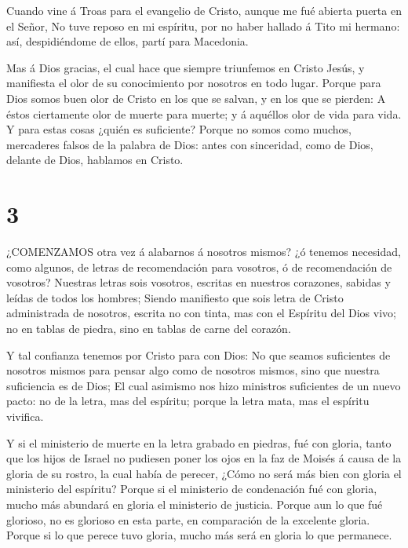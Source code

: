  Cuando vine á Troas para el evangelio de Cristo, aunque me
fué abierta puerta en el Señor,  No tuve reposo en mi
espíritu, por no haber hallado á Tito mi hermano: así, despidiéndome de
ellos, partí para Macedonia.

 Mas á Dios gracias, el cual hace que siempre triunfemos en
Cristo Jesús, y manifiesta el olor de su conocimiento por nosotros en
todo lugar.  Porque para Dios somos buen olor de Cristo en
los que se salvan, y en los que se pierden:  A éstos
ciertamente olor de muerte para muerte; y á aquéllos olor de vida para
vida. Y para estas cosas ¿quién es suficiente?  Porque no
somos como muchos, mercaderes falsos de la palabra de Dios: antes con
sinceridad, como de Dios, delante de Dios, hablamos en Cristo.

\hypertarget{section-2}{%
\section{3}\label{section-2}}

 ¿COMENZAMOS otra vez á alabarnos á nosotros mismos? ¿ó
tenemos necesidad, como algunos, de letras de recomendación para
vosotros, ó de recomendación de vosotros?  Nuestras letras
sois vosotros, escritas en nuestros corazones, sabidas y leídas de todos
los hombres;  Siendo manifiesto que sois letra de Cristo
administrada de nosotros, escrita no con tinta, mas con el Espíritu del
Dios vivo; no en tablas de piedra, sino en tablas de carne del corazón.

 Y tal confianza tenemos por Cristo para con Dios:
 No que seamos suficientes de nosotros mismos para pensar
algo como de nosotros mismos, sino que nuestra suficiencia es de Dios;
 El cual asimismo nos hizo ministros suficientes de un nuevo
pacto: no de la letra, mas del espíritu; porque la letra mata, mas el
espíritu vivifica.

 Y si el ministerio de muerte en la letra grabado en
piedras, fué con gloria, tanto que los hijos de Israel no pudiesen poner
los ojos en la faz de Moisés á causa de la gloria de su rostro, la cual
había de perecer,  ¿Cómo no será más bien con gloria el
ministerio del espíritu?  Porque si el ministerio de
condenación fué con gloria, mucho más abundará en gloria el ministerio
de justicia.  Porque aun lo que fué glorioso, no es
glorioso en esta parte, en comparación de la excelente gloria.
 Porque si lo que perece tuvo gloria, mucho más será en
gloria lo que permanece.

